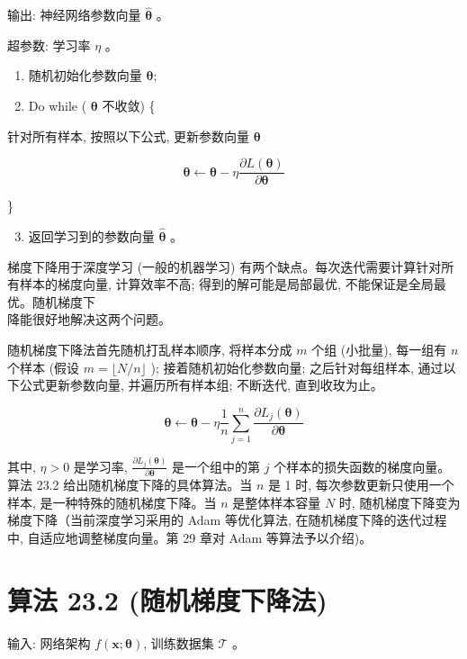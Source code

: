 \documentclass[10pt]{article}
\begin{document}
\begin{CJK*}{UTF8}{bsmi}
输出: 神经网络参数向量 $\hat{\boldsymbol{\theta}}$ 。

超参数: 学习率 $\eta$ 。

\begin{enumerate}
  \item 随机初始化参数向量 $\boldsymbol{\theta} ;$

  \item Do while ( $\boldsymbol{\theta}$ 不收敛) \{

\end{enumerate}

针对所有样本, 按照以下公式, 更新参数向量 $\boldsymbol{\theta}$

$$
\boldsymbol{\theta} \leftarrow \boldsymbol{\theta}-\eta \frac{\partial L(\boldsymbol{\theta})}{\partial \boldsymbol{\theta}}
$$

\}

\begin{enumerate}
  \setcounter{enumi}{2}
  \item 返回学习到的参数向量 $\hat{\boldsymbol{\theta}}$ 。
\end{enumerate}

梯度下降用于深度学习 (一般的机器学习) 有两个缺点。每次迭代需要计算针对所有样本的梯度向量, 计算效率不高; 得到的解可能是局部最优, 不能保证是全局最优。随机梯度下\\
降能很好地解决这两个问题。

随机梯度下降法首先随机打乱样本顺序, 将样本分成 $m$ 个组 (小批量), 每一组有 $n$ 个样本 (假设 $m=\lfloor N / n\rfloor$ ); 接着随机初始化参数向量; 之后针对每组样本, 通过以下公式更新参数向量, 并遍历所有样本组; 不断迭代, 直到收玫为止。


\begin{equation*}
\boldsymbol{\theta} \leftarrow \boldsymbol{\theta}-\eta \frac{1}{n} \sum_{j=1}^{n} \frac{\partial L_{j}(\boldsymbol{\theta})}{\partial \boldsymbol{\theta}} \tag{23.41}
\end{equation*}


其中, $\eta>0$ 是学习率, $\frac{\partial L_{j}(\boldsymbol{\theta})}{\partial \boldsymbol{\theta}}$ 是一个组中的第 $j$ 个样本的损失函数的梯度向量。算法 23.2 给出随机梯度下降的具体算法。当 $n$ 是 1 时, 每次参数更新只使用一个样本, 是一种特殊的随机梯度下降。当 $n$ 是整体样本容量 $N$ 时, 随机梯度下降变为梯度下降（当前深度学习采用的 Adam 等优化算法, 在随机梯度下降的迭代过程中, 自适应地调整梯度向量。第 29 章对 Adam 等算法予以介绍)。

\section*{算法 23.2 (随机梯度下降法)}
输入: 网络架构 $f(\boldsymbol{x} ; \boldsymbol{\theta})$, 训练数据集 $\mathcal{T}$ 。


\end{CJK*}
\end{document}
